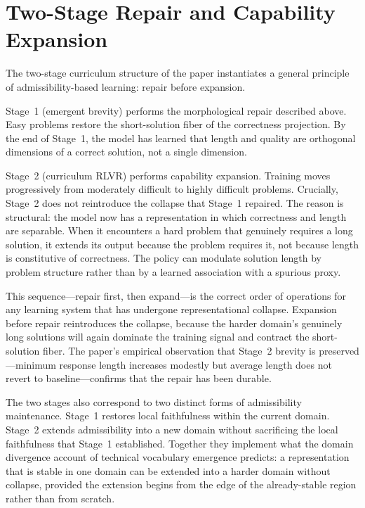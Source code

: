 \documentclass[11pt]{article}
\theoremstyle{rthm}
\theoremstyle{rdef}
\theoremstyle{remark}
\begin{document}
\section{Two-Stage Repair and Capability Expansion}
\label{sec:stages}

The two-stage curriculum structure of the paper instantiates a
general principle of admissibility-based learning: repair before
expansion.

Stage~1 (emergent brevity) performs the morphological repair described
above. Easy problems restore the short-solution fiber of the
correctness projection. By the end of Stage~1, the model has learned
that length and quality are orthogonal dimensions of a correct solution,
not a single dimension.

Stage~2 (curriculum RLVR) performs capability expansion. Training
moves progressively from moderately difficult to highly difficult
problems. Crucially, Stage~2 does not reintroduce the collapse that
Stage~1 repaired. The reason is structural: the model now has a
representation in which correctness and length are separable. When
it encounters a hard problem that genuinely requires a long solution,
it extends its output because the problem requires it, not because
length is constitutive of correctness. The policy can modulate solution
length by problem structure rather than by a learned association with
a spurious proxy.

This sequence---repair first, then expand---is the correct order of
operations for any learning system that has undergone representational
collapse. Expansion before repair reintroduces the collapse, because
the harder domain's genuinely long solutions will again dominate the
training signal and contract the short-solution fiber. The paper's
empirical observation that Stage~2 brevity is preserved---minimum
response length increases modestly but average length does not revert
to baseline---confirms that the repair has been durable.

The two stages also correspond to two distinct forms of admissibility
maintenance. Stage~1 restores local faithfulness within the current
domain. Stage~2 extends admissibility into a new domain without
sacrificing the local faithfulness that Stage~1 established. Together
they implement what the domain divergence account of technical
vocabulary emergence predicts: a representation that is stable in
one domain can be extended into a harder domain without collapse,
provided the extension begins from the edge of the already-stable
region rather than from scratch.
\end{document}
